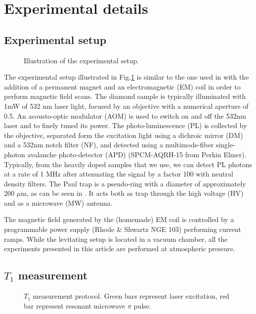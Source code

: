 \documentclass[preprintnumbers,amsmath,amssymb,onecolumn,12pt]{revtex4}
\begin{document}
\section{Experimental details}

\subsection{Experimental setup}

\begin{figure}[!ht]
  \centering {}
  \caption{Illustration of the experimental setup.}
	\label{Optics}
\end{figure}

The experimental setup illustrated in Fig.\ref{Optics} is similar to the one used in \citep{DelordPRL} with the addition of a permanent magnet and an electromagnetic (EM) coil in order to perform magnetic field scans. The diamond sample is typically illuminated with 1mW of 532 nm laser light, focused by an objective with a numerical aperture of 0.5. An acousto-optic modulator (AOM) is used to switch on and off the 532nm laser and to finely tuned its power. The photo-luminescence (PL) is collected by the objective, separated form the excitation light using a dichroic mirror (DM) and a 532nm notch filter (NF), and detected using a multimode-fiber single-photon avalanche photo-detector (APD) (SPCM-AQRH-15 from Perkin Elmer). Typically, from the heavily doped samples that we use, we can detect PL photons at a rate of 1 MHz after attenuating the signal by a factor 100 with neutral density filters. 
The Paul trap is a pseudo-ring with a diameter of approximately 200 $\mu$m, as can be seen in \citep{DelordPhD}. It acts both as trap through the high voltage (HV) and as a microwave (MW) antenna.

The magnetic field generated by the (homemade) EM coil is controlled by a programmable power supply (Rhode \& Shwartz NGE 103) performing current ramps.
While the levitating setup is located in a vacuum chamber, all the experiments presented in this article are performed at atmospheric pressure.

\subsection{$T_1$ measurement}
\begin{figure}[!ht]
  \centering {}
  \caption{$T_1$ measurement protocol. Green bars represent laser excitation, red bar represent resonant microwave $\pi$ pulse.}
	\label{T1_protocol}
\end{figure}
\end{document}
